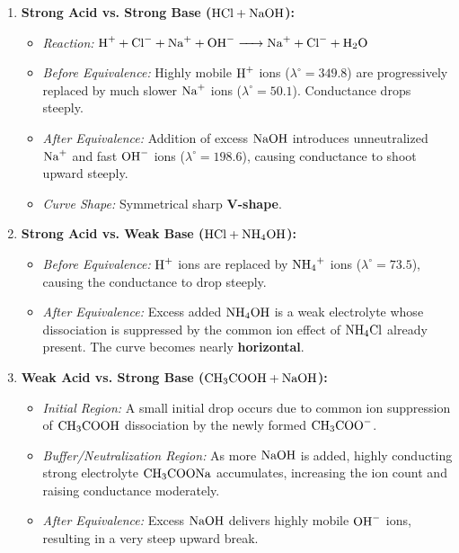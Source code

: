 \begin{enumerate}[leftmargin=*]
    \item \textbf{Strong Acid vs. Strong Base ($\ce{HCl} + \ce{NaOH}$):}
    \begin{itemize}
        \item \emph{Reaction:} $\ce{H+ + Cl- + Na+ + OH- -> Na+ + Cl- + H2O}$
        \item \emph{Before Equivalence:} Highly mobile $\ce{H+}$ ions ($\lambda^\circ = 349.8$) are progressively replaced by much slower $\ce{Na+}$ ions ($\lambda^\circ = 50.1$). Conductance drops steeply.
        \item \emph{After Equivalence:} Addition of excess $\ce{NaOH}$ introduces unneutralized $\ce{Na+}$ and fast $\ce{OH-}$ ions ($\lambda^\circ = 198.6$), causing conductance to shoot upward steeply.
        \item \emph{Curve Shape:} Symmetrical sharp \textbf{V-shape}.
    \end{itemize}

    \item \textbf{Strong Acid vs. Weak Base ($\ce{HCl} + \ce{NH4OH}$):}
    \begin{itemize}
        \item \emph{Before Equivalence:} $\ce{H+}$ ions are replaced by $\ce{NH4+}$ ions ($\lambda^\circ = 73.5$), causing the conductance to drop steeply.
        \item \emph{After Equivalence:} Excess added $\ce{NH4OH}$ is a weak electrolyte whose dissociation is suppressed by the common ion effect of $\ce{NH4Cl}$ already present. The curve becomes nearly \textbf{horizontal}.
    \end{itemize}

    \item \textbf{Weak Acid vs. Strong Base ($\ce{CH3COOH} + \ce{NaOH}$):}
    \begin{itemize}
        \item \emph{Initial Region:} A small initial drop occurs due to common ion suppression of $\ce{CH3COOH}$ dissociation by the newly formed $\ce{CH3COO-}$.
        \item \emph{Buffer/Neutralization Region:} As more $\ce{NaOH}$ is added, highly conducting strong electrolyte $\ce{CH3COONa}$ accumulates, increasing the ion count and raising conductance moderately.
        \item \emph{After Equivalence:} Excess $\ce{NaOH}$ delivers highly mobile $\ce{OH-}$ ions, resulting in a very steep upward break.
    \end{itemize}


\end{enumerate}
